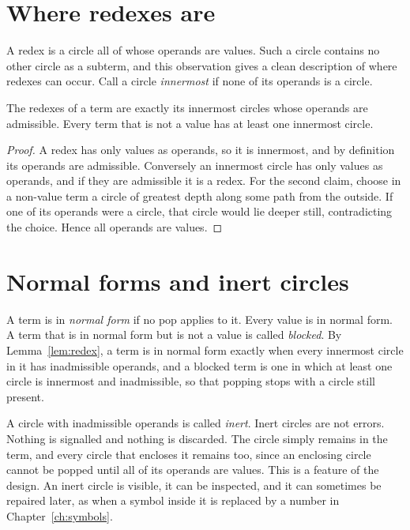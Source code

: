 \section{Where redexes are}

A redex is a circle all of whose operands are values. Such a circle contains no other circle as a subterm, and this observation gives a clean description of where redexes can occur. Call a circle \emph{innermost} if none of its operands is a circle.

\begin{lemma}\label{lem:redex}
The redexes of a term are exactly its innermost circles whose operands are admissible. Every term that is not a value has at least one innermost circle.
\end{lemma}
\begin{proof}
A redex has only values as operands, so it is innermost, and by definition its operands are admissible. Conversely an innermost circle has only values as operands, and if they are admissible it is a redex. For the second claim, choose in a non-value term a circle of greatest depth along some path from the outside. If one of its operands were a circle, that circle would lie deeper still, contradicting the choice. Hence all operands are values.
\end{proof}

\section{Normal forms and inert circles}

A term is in \emph{normal form} if no pop applies to it. Every value is in normal form. A term that is in normal form but is not a value is called \emph{blocked}. By Lemma~\ref{lem:redex}, a term is in normal form exactly when every innermost circle in it has inadmissible operands, and a blocked term is one in which at least one circle is innermost and inadmissible, so that popping stops with a circle still present.

A circle with inadmissible operands is called \emph{inert}. Inert circles are not errors. Nothing is signalled and nothing is discarded. The circle simply remains in the term, and every circle that encloses it remains too, since an enclosing circle cannot be popped until all of its operands are values. This is a feature of the design. An inert circle is visible, it can be inspected, and it can sometimes be repaired later, as when a symbol inside it is replaced by a number in Chapter~\ref{ch:symbols}.

